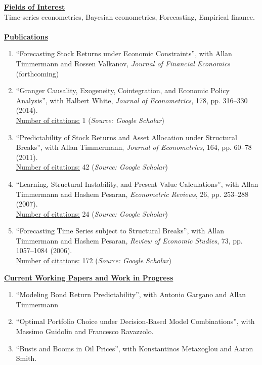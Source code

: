 \documentclass[12pt]{article}
\begin{document}
\underline{\textbf{Fields of Interest}}\\
Time-series econometrics, Bayesian econometrics, Forecasting, Empirical finance.\\ \\
\underline{\textbf{Publications}}
\begin{enumerate}	
	\item ``Forecasting Stock Returns under Economic Constraints'', with Allan Timmermann and Rossen Valkanov, \emph{Journal of Financial Economics} (forthcoming)
	
	\item ``Granger Causality, Exogeneity, Cointegration, and Economic Policy Analysis'', with Halbert White, \emph{Journal of Econometrics}, 178, pp. 316--330 (2014). \\
	\underline{Number of citations:} 1 (\emph{Source: Google Scholar})
	
	\item ``Predictability of Stock Returns and Asset Allocation under Structural Breaks'', with Allan Timmermann, \emph{Journal of Econometrics}, 164, pp. 60--78 (2011). \\
	\underline{Number of citations:} 42 (\emph{Source: Google Scholar})
	
	\item ``Learning, Structural Instability, and Present Value Calculations'', with Allan Timmermann and Hashem Pesaran, \emph{Econometric Reviews}, 26, pp. 253--288 (2007). \\
	\underline{Number of citations:} 24 (\emph{Source: Google Scholar})

	\item ``Forecasting Time Series subject to Structural Breaks'', with Allan Timmermann and Hashem Pesaran, \emph{Review of Economic Studies}, 73, pp. 1057--1084 (2006). \\
	\underline{Number of citations:} 172 (\emph{Source: Google Scholar})

    \setcounter{enumTemp}{\theenumi}
 \end{enumerate}
\underline{\textbf{Current Working Papers and Work in Progress}}
\begin{enumerate}
	\setcounter{enumi}{\theenumTemp}
	\item ``Modeling Bond Return Predictability'', with Antonio Gargano and Allan Timmermann
	\item ``Optimal Portfolio Choice under Decision-Based Model Combinations'', with Massimo Guidolin and Francesco Ravazzolo.
	\item ``Busts and Booms in Oil Prices'', with Konstantinos Metaxoglou  and Aaron Smith.
\end{enumerate}
\end{document}
